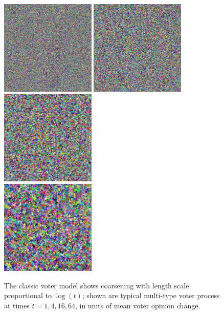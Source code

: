 \documentclass[10pt,english]{report}
\begin{document}
\begin{figure}[htb]
	\centering
	\hfill\includegraphics[width=128pt]{voter-coarsen/1.png}
	\hfill\includegraphics[width=128pt]{voter-coarsen/4.png}
	\hfill\includegraphics[width=128pt]{voter-coarsen/16.png}\hfill~\\
	\vspace{0.1in}
	\hfill\includegraphics[width=128pt]{voter-coarsen/64.png}
	\hfill~
	\caption{\label{fig:multitype-voter-coarsen}The classic voter model shows coarsening with length scale proportional to $\log(t)$; shown are typical multi-type voter process at times $t=1,4,16,64$, in units of mean voter opinion change. }
\end{figure}
\end{document}
